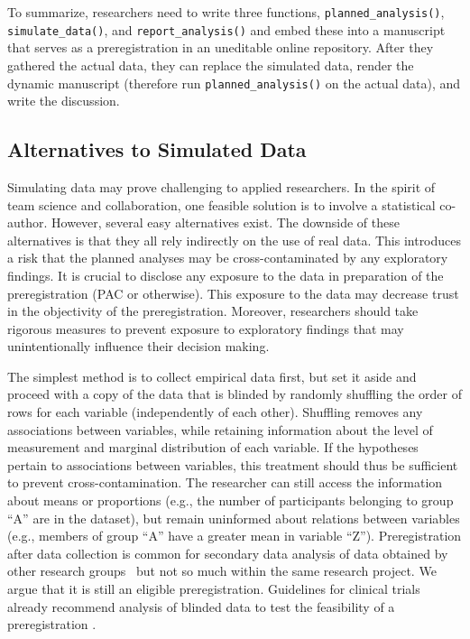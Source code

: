 \documentclass[psych,tutorial,accept,moreauthors,pdftex]{Definitions/mdpi}
\begin{document}
\begin{paracol}{2}
To summarize, researchers need to write three functions,
\texttt{planned\_analysis()}, \texttt{simulate\_data()}, and
\texttt{report\_analysis()} and embed these into a manuscript that
serves as a preregistration in an uneditable online repository. After
they gathered the actual data, they can replace the simulated data,
render the dynamic manuscript (therefore run
\texttt{planned\_analysis()} on the actual data), and write the
discussion.

\subsection{Alternatives to Simulated
Data}\label{alternatives-to-simulated-data}

Simulating data may prove challenging to applied researchers. In the
spirit of team science and collaboration, one feasible solution is to
involve a statistical co-author. However, several easy alternatives
exist. The downside of these alternatives is that they all rely
indirectly on the use of real data. This introduces a risk that the
planned analyses may be cross-contaminated by any exploratory findings.
It is crucial to disclose any exposure to the data in preparation of the
preregistration (PAC or otherwise). This exposure to the data may
decrease trust in the objectivity of the preregistration. Moreover,
researchers should take rigorous measures to prevent exposure to
exploratory findings that may unintentionally influence their decision
making.

The simplest method is to collect empirical data first, but set it aside
and proceed with a copy of the data that is blinded by randomly
shuffling the order of rows for each variable (independently of each
other). Shuffling removes any associations between variables, while
retaining information about the level of measurement and marginal
distribution of each variable. If the hypotheses pertain to associations
between variables, this treatment should thus be sufficient to prevent
cross-contamination. The researcher can still access the information
about means or proportions (e.g., the number of participants belonging
to group ``A'' are in the dataset), but remain uninformed about
relations between variables (e.g., members of group ``A'' have a greater
mean in variable ``Z''). Preregistration after data collection is common
for secondary data analysis of data obtained by other research groups~\citep{westonRecommendationsIncreasingTransparency2019} but not so much
within the same research project. We argue that it is still an eligible
preregistration. Guidelines for clinical trials already recommend
analysis of blinded data to test the feasibility of a preregistration
\citep{ICH1998}.


\end{paracol}
\end{document}
